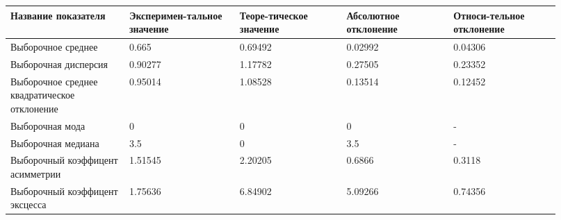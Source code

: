 \begin{center}
\begin{tabular}{|p{0.2\linewidth}|p{0.18\linewidth}|p{0.18\linewidth}|p{0.18\linewidth}|p{0.18\linewidth}|}\hline
Название показателя & Эксперимен{-}тальное значение & Теоре{-}тическое значение & Абсолютное отклонение & Относи{-}тельное отклонение\\\hline
Выборочное среднее & 0.665 & 0.69492 & 0.02992 & 0.04306 \\\hline
Выборочная дисперсия & 0.90277 & 1.17782 & 0.27505 & 0.23352 \\\hline
Выборочное среднее\newline
квадратическое отклонение & 0.95014 & 1.08528 & 0.13514 & 0.12452 \\\hline
Выборочная мода & 0 & 0 & 0 & - \\\hline
Выборочная медиана & 3.5 & 0 & 3.5 & - \\\hline
Выборочный коэффицент асимметрии & 1.51545 & 2.20205 & 0.6866 & 0.3118 \\\hline
Выборочный коэффицент эксцесса & 1.75636 & 6.84902 & 5.09266 & 0.74356 \\\hline
\end{tabular}
\end{center}
